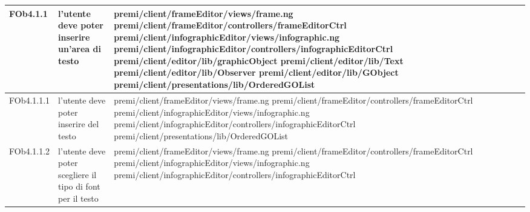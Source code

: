 \begin{longtable}{|l|p{5cm}|p{7cm}|}
\hline
FOb4.1.1 & l'utente deve poter inserire un'area di testo & \hspace{0pt}premi/client/frameEditor/views/frame.ng \linebreak \linebreak premi/client/frameEditor/controllers/frameEditorCtrl \linebreak \linebreak premi/client/infographicEditor/views/infographic.ng \linebreak \linebreak premi/client/infographicEditor/controllers/infographicEditorCtrl \linebreak \linebreak premi/client/editor/lib/graphicObject \linebreak \linebreak premi/client/editor/lib/Text \linebreak \linebreak premi/client/editor/lib/Observer \linebreak \linebreak premi/client/editor/lib/GObject \linebreak \linebreak premi/client/presentations/lib/OrderedGOList \\
\hline
FOb4.1.1.1 & l'utente deve poter inserire del testo & \hspace{0pt}premi/client/frameEditor/views/frame.ng \linebreak \linebreak premi/client/frameEditor/controllers/frameEditorCtrl \linebreak \linebreak premi/client/infographicEditor/views/infographic.ng \linebreak \linebreak premi/client/infographicEditor/controllers/infographicEditorCtrl  \linebreak \linebreak premi/client/presentations/lib/OrderedGOList \\
\hline
FOb4.1.1.2 & l'utente deve poter scegliere il tipo di font per il testo & \hspace{0pt}premi/client/frameEditor/views/frame.ng \linebreak \linebreak premi/client/frameEditor/controllers/frameEditorCtrl \linebreak \linebreak premi/client/infographicEditor/views/infographic.ng \linebreak \linebreak premi/client/infographicEditor/controllers/infographicEditorCtrl \\

\end{longtable}
